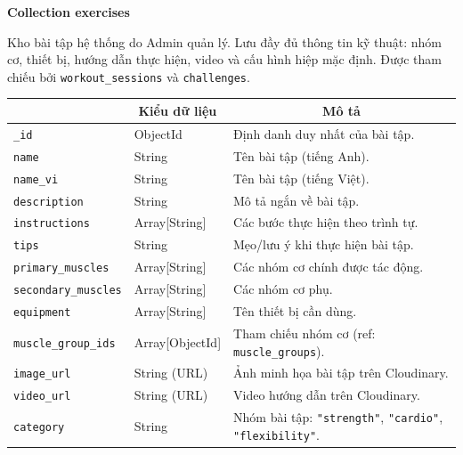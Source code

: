 \textbf{Collection exercises}
\label{subsec:col_exercises}

Kho bài tập hệ thống do Admin quản lý. Lưu đầy đủ thông tin kỹ thuật: nhóm cơ, thiết bị, hướng dẫn thực hiện, video và cấu hình hiệp mặc định. Được tham chiếu bởi \texttt{workout\_sessions} và \texttt{challenges}.

\begin{table}[H]
\centering
\footnotesize
\setlength{\tabcolsep}{5pt}
\renewcommand{\arraystretch}{1.15}
\begin{tabularx}{\textwidth}{|p{3.8cm}|p{2.6cm}|X|}
\hline
\rowcolor{dbheadblue}
\multicolumn{1}{|c|}{\color{white}\textbf{Trường}} &
\multicolumn{1}{c|}{\color{white}\textbf{Kiểu dữ liệu}} &
\multicolumn{1}{c|}{\color{white}\textbf{Mô tả}} \\
\hline
\texttt{\_id}              & ObjectId      & Định danh duy nhất của bài tập. \\ \hline
\rowcolor{dbrowalt}
\texttt{name}             & String        & Tên bài tập (tiếng Anh). \\ \hline
\texttt{name\_vi}          & String        & Tên bài tập (tiếng Việt). \\ \hline
\rowcolor{dbrowalt}
\texttt{description}      & String        & Mô tả ngắn về bài tập. \\ \hline
\texttt{instructions}     & Array[String] & Các bước thực hiện theo trình tự. \\ \hline
\rowcolor{dbrowalt}
\texttt{tips}             & String        & Mẹo/lưu ý khi thực hiện bài tập. \\ \hline
\texttt{primary\_muscles}  & Array[String] & Các nhóm cơ chính được tác động. \\ \hline
\rowcolor{dbrowalt}
\texttt{secondary\_muscles} & Array[String] & Các nhóm cơ phụ. \\ \hline
\texttt{equipment}        & Array[String] & Tên thiết bị cần dùng. \\ \hline
\rowcolor{dbrowalt}
\texttt{muscle\_group\_ids} & Array[ObjectId] & Tham chiếu nhóm cơ (ref: \texttt{muscle\_groups}). \\ \hline
\texttt{image\_url}        & String (URL)  & Ảnh minh họa bài tập trên Cloudinary. \\ \hline
\rowcolor{dbrowalt}
\texttt{video\_url}        & String (URL)  & Video hướng dẫn trên Cloudinary. \\ \hline
\texttt{category}         & String        & Nhóm bài tập: \texttt{"strength"}, \texttt{"cardio"}, \texttt{"flexibility"}. \\ \hline

\end{tabularx}
\end{table}

